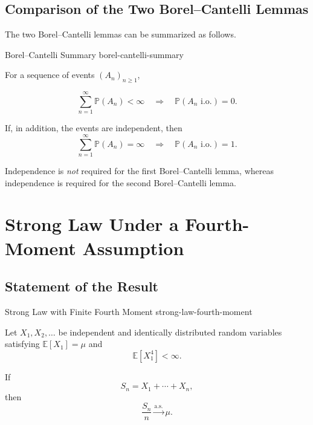 
\subsection{Comparison of the Two Borel--Cantelli Lemmas}

The two Borel--Cantelli lemmas can be summarized as follows.

\begin{theorem}{Borel--Cantelli Summary}
{borel-cantelli-summary}

For a sequence of events $(A_n)_{n\geq1}$,

\[
\sum_{n=1}^{\infty}\mathbb{P}(A_n)<\infty
\quad\Longrightarrow\quad
\mathbb{P}(A_n\text{ i.o.})=0.
\]

If, in addition, the events are independent, then
\[
\sum_{n=1}^{\infty}\mathbb{P}(A_n)=\infty
\quad\Longrightarrow\quad
\mathbb{P}(A_n\text{ i.o.})=1.
\]

\end{theorem}

\begin{observation}

Independence is \emph{not} required for the first Borel--Cantelli
lemma, whereas independence is required for the second Borel--Cantelli
lemma.

\end{observation}



\section{Strong Law Under a Fourth-Moment Assumption}

\subsection{Statement of the Result}

\begin{theorem}{Strong Law with Finite Fourth Moment}
{strong-law-fourth-moment}

Let
\(
X_1,X_2,\ldots
\)
be independent and identically distributed random variables satisfying
\(
\mathbb{E}[X_1]=\mu
\)
and
\[
\mathbb{E}[X_1^4]<\infty.
\]

If
\[
S_n=X_1+\cdots+X_n,
\]
then
\[
\boxed{
\frac{S_n}{n}
\xrightarrow{\mathrm{a.s.}}
\mu.
}
\]

\end{theorem}



